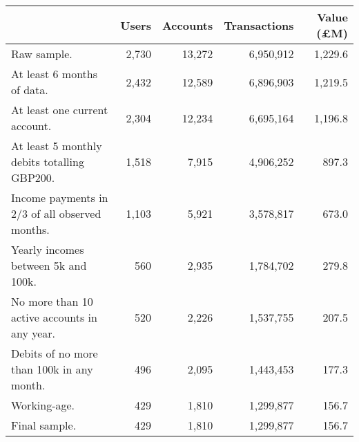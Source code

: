 \begin{tabular}{lrrrr}
\toprule
                                               & Users & Accounts & Transactions & Value (\pounds M) \\
\midrule
                                   Raw sample. & 2,730 &   13,272 &    6,950,912 &           1,229.6 \\
                    At least 6 months of data. & 2,432 &   12,589 &    6,896,903 &           1,219.5 \\
                 At least one current account. & 2,304 &   12,234 &    6,695,164 &           1,196.8 \\
   At least 5 monthly debits totalling GBP200. & 1,518 &    7,915 &    4,906,252 &             897.3 \\
Income payments in 2/3 of all observed months. & 1,103 &    5,921 &    3,578,817 &             673.0 \\
           Yearly incomes between 5k and 100k. &   560 &    2,935 &    1,784,702 &             279.8 \\
  No more than 10 active accounts in any year. &   520 &    2,226 &    1,537,755 &             207.5 \\
     Debits of no more than 100k in any month. &   496 &    2,095 &    1,443,453 &             177.3 \\
                                  Working-age. &   429 &    1,810 &    1,299,877 &             156.7 \\
                                 Final sample. &   429 &    1,810 &    1,299,877 &             156.7 \\
\bottomrule
\end{tabular}
